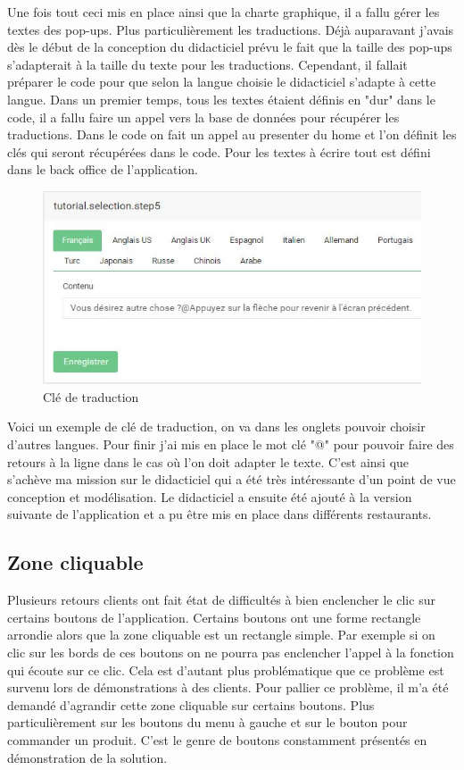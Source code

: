 Une fois tout ceci mis en place ainsi que la charte graphique, il a fallu gérer les textes des pop-ups. Plus particulièrement les traductions. Déjà auparavant j'avais dès le début de la conception du didacticiel prévu le fait que la taille des pop-ups s'adapterait à la taille du texte pour les traductions. Cependant, il fallait préparer le code pour que selon la langue choisie le didacticiel s'adapte à cette langue. Dans un premier temps, tous les textes étaient définis en "dur" dans le code, il a fallu faire un appel vers la base de données pour récupérer les traductions. Dans le code on fait un appel au presenter du home et l'on définit les clés qui seront récupérées dans le code. Pour les textes à écrire tout est défini dans le back office de l'application.

\begin{figure}[!htb]
  \centering
  \includegraphics[width=115mm,scale=0.5]{images/tutoriel_trad.JPG}
  \caption{Clé de traduction}
  \label{fig:boat1}
\end{figure}

Voici un exemple de clé de traduction, on va dans les onglets pouvoir choisir d'autres langues. Pour finir j'ai mis en place le mot clé "@" pour pouvoir faire des retours à la ligne dans le cas où l'on doit adapter le texte. C'est ainsi que s'achève ma mission sur le didacticiel qui a été très intéressante d'un point de vue conception et modélisation. Le didacticiel a ensuite été ajouté à la version suivante de l'application et a pu être mis en place dans différents restaurants.

\subsection{Zone cliquable}

Plusieurs retours clients ont fait état de difficultés à bien enclencher le clic sur certains boutons de l'application. Certains boutons ont une forme rectangle arrondie alors que la zone cliquable est un rectangle simple. Par exemple si on clic sur les bords de ces boutons on ne pourra pas enclencher l'appel à la fonction qui écoute sur ce clic. Cela est d'autant plus problématique que ce problème est survenu lors de démonstrations à des clients. Pour pallier ce problème, il m'a été demandé d'agrandir cette zone cliquable sur certains boutons. Plus particulièrement sur les boutons du menu à gauche et sur le bouton pour commander un produit. C'est le genre de boutons constamment présentés en démonstration de la solution.

